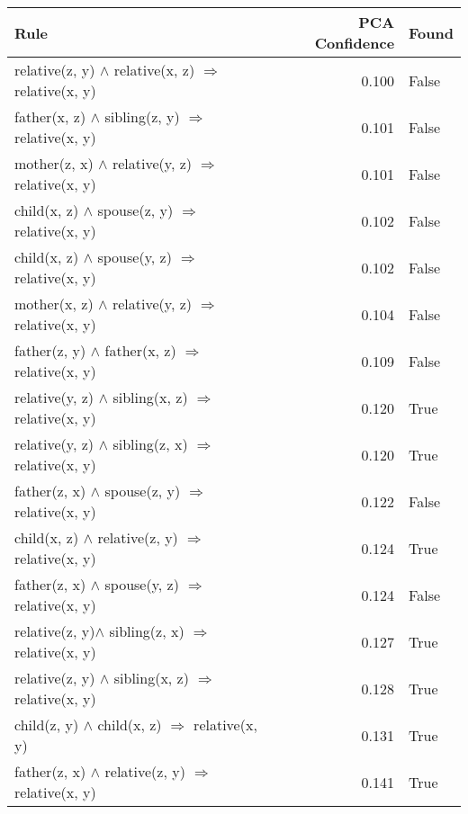 \begin{longtable}{lrl}
\toprule
                                                    Rule &  PCA Confidence &  Found \\
\midrule
relative(z, y) $\wedge$ relative(x, z)   $\Rightarrow$ relative(x, y) &           0.100 &                    False \\
   father(x, z) $\wedge$ sibling(z, y)   $\Rightarrow$ relative(x, y) &           0.101 &                    False \\
  mother(z, x) $\wedge$ relative(y, z)   $\Rightarrow$ relative(x, y) &           0.101 &                    False \\
     child(x, z) $\wedge$ spouse(z, y)   $\Rightarrow$ relative(x, y) &           0.102 &                    False \\
     child(x, z) $\wedge$ spouse(y, z)   $\Rightarrow$ relative(x, y) &           0.102 &                    False \\
  mother(x, z) $\wedge$ relative(y, z)   $\Rightarrow$ relative(x, y) &           0.104 &                    False \\
    father(z, y) $\wedge$ father(x, z)   $\Rightarrow$ relative(x, y) &           0.109 &                    False \\
 relative(y, z) $\wedge$ sibling(x, z)   $\Rightarrow$ relative(x, y) &           0.120 &                     True \\
 relative(y, z) $\wedge$ sibling(z, x)   $\Rightarrow$ relative(x, y) &           0.120 &                     True \\
    father(z, x) $\wedge$ spouse(z, y)   $\Rightarrow$ relative(x, y) &           0.122 &                    False \\
   child(x, z) $\wedge$ relative(z, y)   $\Rightarrow$ relative(x, y) &           0.124 &                     True \\
    father(z, x) $\wedge$ spouse(y, z)   $\Rightarrow$ relative(x, y) &           0.124 &                    False \\
 relative(z, y)$\wedge$  sibling(z, x)   $\Rightarrow$ relative(x, y) &           0.127 &                     True \\
 relative(z, y) $\wedge$ sibling(x, z)   $\Rightarrow$ relative(x, y) &           0.128 &                     True \\
      child(z, y) $\wedge$ child(x, z)   $\Rightarrow$ relative(x, y) &           0.131 &                     True \\
  father(z, x) $\wedge$ relative(z, y)   $\Rightarrow$ relative(x, y) &           0.141 &                     True \\

\end{longtable}
